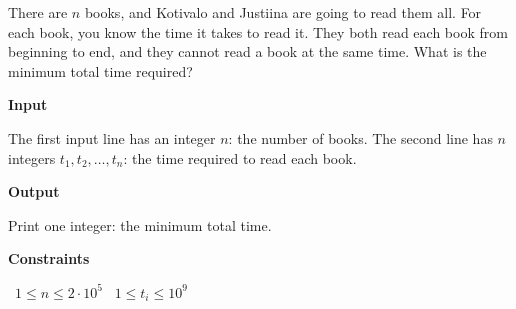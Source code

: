 There are $n$ books, and Kotivalo and Justiina are going to read them all. For each book, you know the time it takes to read it.
They both read each book from beginning to end, and they cannot read a book at the same time. What is the minimum total time required?

\vspace{0.3cm}\noindent\textbf{Input}

The first input line has an integer $n$: the number of books.
The second line has $n$ integers $t_1,t_2,\dots,t_n$: the time required to read each book.

\vspace{0.3cm}\noindent\textbf{Output}

Print one integer: the minimum total time.

\vspace{0.3cm}\noindent\textbf{Constraints}

\textbullet\ $1 \le n \le 2 \cdot 10^5$
\textbullet\ $1 \le t_i \le 10^9$